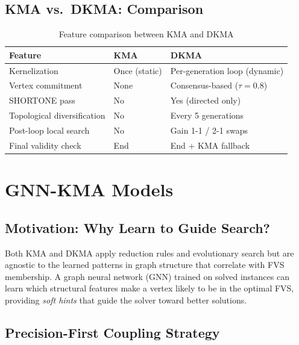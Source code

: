 \documentclass[10pt,a4paper]{report}
\theoremstyle{definition}
\begin{document}
\section{KMA vs.\ DKMA: Comparison}

\begin{table}[H]
	\centering
	\caption{Feature comparison between KMA and DKMA}
	\label{tab:kma_dkma_compare}
	\begin{tabular}{lll}
		\toprule
		\textbf{Feature}            & \textbf{KMA}  & \textbf{DKMA}                  \\
		\midrule
		Kernelization               & Once (static) & Per-generation loop (dynamic)  \\
		Vertex commitment           & None          & Consensus-based ($\tau = 0.8$) \\
		SHORTONE pass               & No            & Yes (directed only)            \\
		Topological diversification & No            & Every 5 generations            \\
		Post-loop local search      & No            & Gain 1-1 / 2-1 swaps           \\
		Final validity check        & End           & End + KMA fallback             \\
		\bottomrule
	\end{tabular}
\end{table}

\chapter{GNN-KMA Models}
\label{ch:gnnkma}

\section{Motivation: Why Learn to Guide Search?}

Both KMA and DKMA apply reduction rules and evolutionary search but are agnostic to the learned patterns in graph structure that correlate with FVS membership. A graph neural network (GNN) trained on solved instances can learn which structural features make a vertex likely to be in the optimal FVS, providing \emph{soft hints} that guide the solver toward better solutions.

\section{Precision-First Coupling Strategy}
\end{document}
